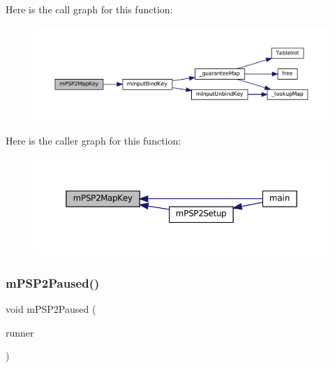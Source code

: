 Here is the call graph for this function\+:
\nopagebreak
\begin{figure}[H]
\begin{center}
\leavevmode
\includegraphics[width=350pt]{psp2-context_8c_a0ff9569feeb9a2f318792b681331c9ab_cgraph}
\end{center}
\end{figure}
Here is the caller graph for this function\+:
\nopagebreak
\begin{figure}[H]
\begin{center}
\leavevmode
\includegraphics[width=350pt]{psp2-context_8c_a0ff9569feeb9a2f318792b681331c9ab_icgraph}
\end{center}
\end{figure}
\mbox{\label{psp2-context_8c_a7f9c754e1ebf551ba6e39e76d7135f91}} 
\subsubsection{\texorpdfstring{m\+P\+S\+P2\+Paused()}{mPSP2Paused()}}
{\footnotesize\ttfamily void m\+P\+S\+P2\+Paused (\begin{DoxyParamCaption}\item[{struct \mbox{\hyperlink{structm_g_u_i_runner}{m\+G\+U\+I\+Runner}} $\ast$}]{runner }\end{DoxyParamCaption})}

